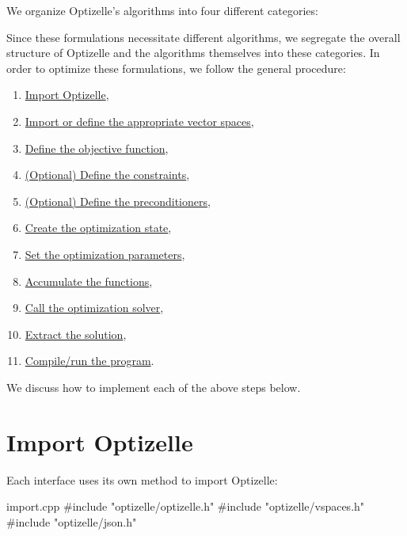 \documentclass{report}
\newcommand{\secimport}{Import Optizelle}
\newcommand{\secimportvs}{Import or define the appropriate vector spaces}
\newcommand{\secobjective}{Define the objective function}
\newcommand{\secconstraints}{(Optional) Define the constraints}
\newcommand{\secpreconditioners}{(Optional) Define the preconditioners}
\newcommand{\secstate}{Create the optimization state}
\newcommand{\secparams}{Set the optimization parameters}
\newcommand{\secfns}{Accumulate the functions}
\newcommand{\secsolve}{Call the optimization solver}
\newcommand{\secextract}{Extract the solution}
\newcommand{\seccompilerun}{Compile/run the program}
\begin{document}
        We organize Optizelle's algorithms into four different categories: 
\begin{center}
    \usebox{\boxOptimizationTypes}
\end{center}
\noindent Since these formulations necessitate different algorithms, we segregate the overall structure of Optizelle and the algorithms themselves into these categories.  
        In order to optimize these formulations, we follow the general procedure:
\begin{enumerate}
    \item \hyperref[sec:import]{\secimport},
    \item \hyperref[sec:importvs]{\secimportvs},
    \item \hyperref[sec:objective]{\secobjective},
    \item \hyperref[sec:constraints]{\secconstraints},
    \item \hyperref[sec:preconditioners]{\secpreconditioners},
    \item \hyperref[sec:state]{\secstate},
    \item \hyperref[sec:params]{\secparams},
    \item \hyperref[sec:fns]{\secfns},
    \item \hyperref[sec:solve]{\secsolve},
    \item \hyperref[sec:extract]{\secextract},
    \item \hyperref[sec:compilerun]{\seccompilerun}.
\end{enumerate}
We discuss how to implement each of the above steps below. 

\section{\secimport}\label{sec:import}

        Each interface uses its own method to import Optizelle:
\begin{filecontents*}{import.cpp}
#include "optizelle/optizelle.h"
#include "optizelle/vspaces.h"
#include "optizelle/json.h"
\end{filecontents*}
\end{document}
